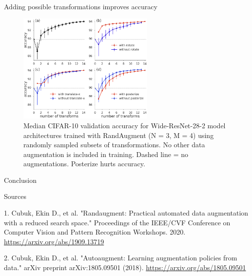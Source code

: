 \documentclass{beamer}
\begin{document}
\begin{frame}{Adding possible transformations improves accuracy}
\begin{figure}[h]
\includegraphics[width=0.6\textwidth]{img/N}
\caption{Median CIFAR-10 validation accuracy for Wide-ResNet-28-2 model architectures trained with RandAugment (N = 3, M = 4) using randomly sampled subsets of transformations. No other data augmentation is included in training. Dashed line = no augmentations. Posterize hurts accuracy.}
\end{figure}
\end{frame}
\begin{frame}{Conclusion}

\end{frame}

\begin{frame}{Sources}
\begin{thebibliography}{0}

   1. Cubuk, Ekin D., et al. "Randaugment: Practical automated data augmentation with a reduced search space." Proceedings of the IEEE/CVF Conference on Computer Vision and Pattern Recognition Workshops. 2020. \url{https://arxiv.org/abs/1909.13719} 
  
    2. Cubuk, Ekin D., et al. "Autoaugment: Learning augmentation policies from data." arXiv preprint arXiv:1805.09501 (2018). \url{https://arxiv.org/abs/1805.09501} 
   
\end{thebibliography}
\end{frame} 
\end{document}
